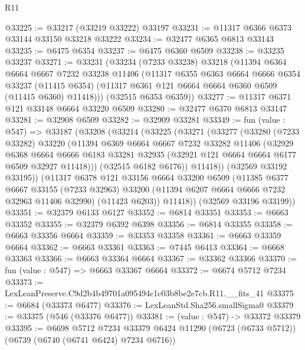 \begin{lexlean}{R11}
\begin{coremodule}
@33225 := @33217 (@33219 @33222) @33197
@33231 := @11317 @6366 @6373 @33144 @33150 @33218 @33222
@33234 := @32477 @6365 @6813 @33143
@33235 := @6475 @6354
@33237 := @6475 @6360 @6509
@33238 := @33235 @33237
@33271 := @33231
    (@33234
      (@7233 @33238)
      @33218
      (@11394
        @6364
        @6664
        @6667
        @7232
        @33238
        @11406
        (@11317
          @6355
          @6363
          @6664
          @6666
          @6354
          @33237
          (@11415 @6354)
          (@11317 @6361 @121 @6664 @6664 @6360 @6509 (@11415 @6360) @11418)))
      (@32515 @6353 @6359))
@33277 := @11317 @6371 @121 @33148 @6664 @33220 @6509
@33280 := @32477 @6370 @6813 @33147
@33281 := @32908 @6509
@33282 := @32909 @33281
@33349 := fun (value : @547) =>
  @33187
    (@33208
      (@33214
        (@33225
          (@33271
            (@33277
              (@33280
                (@7233 @33282)
                @33220
                (@11394
                  @6369
                  @6664
                  @6667
                  @7232
                  @33282
                  @11406
                  (@32929
                    @6368
                    @6664
                    @6666
                    @6183
                    @33281
                    @32935
                    (@32921 @121 @6664 @6664 @6177 @6509 @32927 @11418)))
                (@32515 @6182 @6176))
              @11418))
          (@32569 @33192 @33195))
        (@11317
          @6378
          @121
          @33156
          @6664
          @33200
          @6509
          (@11385
            @6377
            @6667
            @33155
            (@7233 @32963)
            @33200
            (@11394 @6207 @6664 @6666 @7232 @32963 @11406 @32990)
            (@11423 @6203))
          @11418))
      (@32569 @33196 @33199))
@33351 := @32379 @6133 @6127
@33352 := @6814 @33351
@33353 := @6663 @33352
@33355 := @32379 @6392 @6398
@33356 := @6814 @33355
@33358 := @6663 @33356 @6664
@33359 := @33353 @33358
@33361 := @6663 @33359 @6664
@33362 := @6663 @33361
@33363 := @7445 @6413
@33364 := @6668 @33363
@33366 := @6663 @33364 @6664
@33367 := @33362 @33366
@33370 := fun (value : @547) => @6663 @33367 @6664
@33372 := @6674 @5712 @7234
@33373 := LexLeanPreserve.C9d2b4b49701a095494c1c03b8be2e7cb.R11.__fits_41
@33375 := @6684 (@33373 @6477)
@33376 := LexLeanStd.Sha256.smallSigma0
@33379 := @33375 (@546 (@33376 @6477))
@33381 := (value : @547) -> @33372 @33379
@33395 := @6698
    @5712
    @7234
    @33379
    @6424
    @11290
    (@6723 (@6733 @5712))
    (@6739 (@6740 (@6741 @6424) @7234 @6716))

\end{coremodule}
\end{lexlean}
